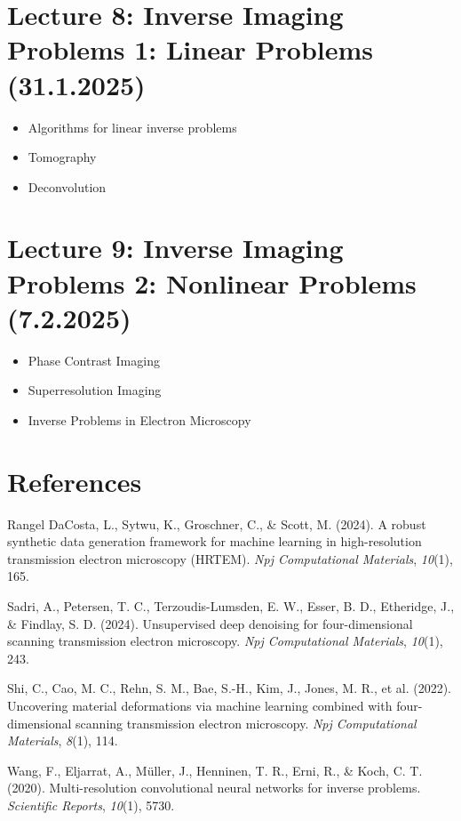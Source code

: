 \documentclass[
]{agujournal2019}
\providecommand{\tightlist}{%
  \setlength{\itemsep}{0pt}\setlength{\parskip}{0pt}}\usepackage{longtable,booktabs,array}
\newlength{\cslhangindent}
\newenvironment{CSLReferences}[2] %
 {\begin{list}{}{%
  \setlength{\itemindent}{0pt}
  \setlength{\leftmargin}{0pt}
  \setlength{\parsep}{0pt}
  \ifodd #1
   \setlength{\leftmargin}{\cslhangindent}
   \setlength{\itemindent}{-1\cslhangindent}
  \fi
  \setlength{\itemsep}{#2\baselineskip}}}
 {\end{list}}
\begin{document}
\section{Lecture 8: Inverse Imaging Problems 1: Linear Problems
(31.1.2025)}\label{sec-lecture9}

\begin{itemize}
\tightlist
\item
  Algorithms for linear inverse problems
\item
  Tomography
\item
  Deconvolution
\end{itemize}

\section{Lecture 9: Inverse Imaging Problems 2: Nonlinear Problems
(7.2.2025)}\label{sec-lecture10}

\begin{itemize}
\tightlist
\item
  Phase Contrast Imaging
\item
  Superresolution Imaging
\item
  Inverse Problems in Electron Microscopy
\end{itemize}

\section*{References}\label{references}

\label{refs}
\begin{CSLReferences}{1}{0}
\vspace{1em}

Rangel DaCosta, L., Sytwu, K., Groschner, C., \& Scott, M. (2024). A
robust synthetic data generation framework for machine learning in
high-resolution transmission electron microscopy (HRTEM). \emph{Npj
Computational Materials}, \emph{10}(1), 165.

Sadri, A., Petersen, T. C., Terzoudis-Lumsden, E. W., Esser, B. D.,
Etheridge, J., \& Findlay, S. D. (2024). Unsupervised deep denoising for
four-dimensional scanning transmission electron microscopy. \emph{Npj
Computational Materials}, \emph{10}(1), 243.

Shi, C., Cao, M. C., Rehn, S. M., Bae, S.-H., Kim, J., Jones, M. R., et
al. (2022). Uncovering material deformations via machine learning
combined with four-dimensional scanning transmission electron
microscopy. \emph{Npj Computational Materials}, \emph{8}(1), 114.

Wang, F., Eljarrat, A., Müller, J., Henninen, T. R., Erni, R., \& Koch,
C. T. (2020). Multi-resolution convolutional neural networks for inverse
problems. \emph{Scientific Reports}, \emph{10}(1), 5730.

\end{CSLReferences}
\end{document}
